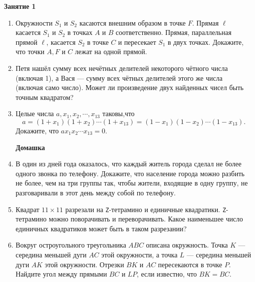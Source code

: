 \documentclass{article}
\begin{document}
\large
	
\begin{center}
	\textbf{Занятие 1}
\end{center}


\begin{enumerate}[label*=\protect\fbox{\arabic{enumi}}]
	
	
\item Окружности $S_1$ и $S_2$ касаются внешним образом в точке $F$. Прямая $\ell$ касается $S_1$ и $S_2$ в точках $A$ и $B$ соответственно. Прямая, параллельная прямой $\ell$, касается $S_2$ в точке $C$ и пересекает $S_1$ в двух точках. Докажите, что точки $A, F$ и $C$ лежат на одной прямой.

\item Петя нашёл сумму всех нечётных делителей некоторого чётного числа (включая 1), а Вася --- сумму всех чётных делителей этого же числа (включая само число). Может ли произведение двух найденных чисел быть точным квадратом?

\item Целые числа $a,x_1,x_2,\cdots,x_{13}$ таковы,что
$$a = (1 + x_1) (1 + x_2) \cdots (1 + x_{13}) = (1 - x_1) (1 - x_2) \cdots (1 - x_{13}). $$
Докажите, что $ax_1x_2 \cdots x_{13} = 0.$

\begin{center}
	\textbf{Домашка}
\end{center}

\item В один из дней года оказалось, что каждый житель города сделал не более одного звонка по телефону. Докажите, что население города можно разбить не более, чем на три группы так, чтобы жители, входящие в одну группу, не разговаривали в этот день между собой по телефону.


\item Квадрат $11 \times 11$ разрезали на \texttt{Z}-тетрамино и единичные квадратики. \texttt{Z}-тетрамино можно поворачивать и переворачивать. Какое наименьшее число единичных квадратиков может быть в таком разрезании?

\item Вокруг остроугольного треугольника $ABC$ описана окружность. Точка $K$ — середина меньшей дуги $AC$ этой окружности, а точка $L$ — середина меньшей дуги $AK$ этой окружности. Отрезки $BK$ и $AC$ пересекаются в точке $P$. Найдите угол между прямыми $BC$ и $LP$, если известно, что $BK = BC$.



\end{enumerate}
\end{document}

